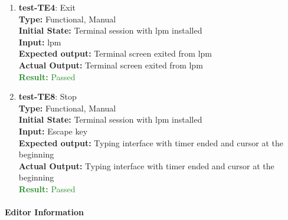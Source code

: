 \documentclass[12pt, titlepage]{article}
\begin{document}
\begin{enumerate}
\item{\textbf{test-TE4}: Exit\\}
\textbf{Type:} Functional, Manual \\
\textbf{Initial State:} Terminal session with lpm installed \\
\textbf{Input:} lpm \\
\textbf{Expected output: } Terminal screen exited from lpm \\
\textbf{Actual Output:} Terminal screen exited from lpm \\
\textcolor{ForestGreen}{\textbf{Result:} Passed}

\item{\textbf{test-TE8}: Stop} \\
\textbf{Type:} Functional, Manual \\
\textbf{Initial State:} Terminal session with lpm installed \\
\textbf{Input:} Escape key \\
\textbf{Expected output: } Typing interface with timer ended and cursor at the beginning\\
\textbf{Actual Output:} Typing interface with timer ended and cursor at the beginning\\
\textcolor{ForestGreen}{\textbf{Result:} Passed}
\end{enumerate}

\paragraph{Editor Information}
\end{document}
